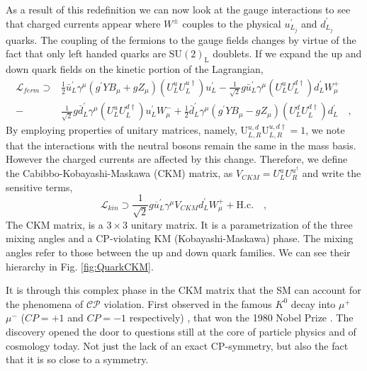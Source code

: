 As a result of this redefinition we can now look at the gauge interactions to see that charged currents appear where $W^\pm$ couples to the physical $u^\prime_{L_j}$ and $d^\prime_{L_j}$ quarks. 
%
The coupling of the fermions to the gauge fields changes by virtue of the fact that only left handed quarks are $\mathrm{SU(2)_L}$ doublets. If we expand the up and down quark fields on the kinetic portion of the Lagrangian,
%
\begin{equation}
\label{LagFermFCCCs}
\begin{aligned}
\mathcal{L}_{ferm} \supset & 
\frac{1}{2} \bar{u}^\prime_L \gamma^\mu \left( g^\prime Y B_\mu + g Z_\mu  \right) \left(U^u_L U^{u \dagger}_L \right) u^\prime_L - \frac{1}{\sqrt{2}} g \bar{u}^\prime_L \gamma^\mu \left( U^u_L U^{d \dagger}_L \right) d^\prime_L W^+_\mu \\    
- 
& \frac{1}{\sqrt{2}} g \bar{d}^\prime_L \gamma^\mu \left( U^u_L U^{d \dagger}_L \right) u^\prime_L W^-_\mu 
+ 
\frac{1}{2} \bar{d}^\prime_L \gamma^\mu \left( g^\prime Y B_\mu - g Z_\mu \right) \left( U^d_L U^{d \dagger}_L \right) d^\prime_L \quad , 
\end{aligned}
\end{equation}
%
By employing properties of unitary matrices, namely, $ \mathrm{U}^{u,d}_{L,R} \mathrm{U}^{u,d \dagger}_{L,R} = 1$, we note that the interactions with the neutral bosons remain the same in the mass basis.
%
However the charged currents are affected by this change.
%
Therefore, we define the Cabibbo-Kobayashi-Maskawa (CKM) matrix, as $V_{CKM} = U^u_L U^{u ^\dagger }_R $ and write the sensitive terms,
%
\begin{equation}
\mathcal{L}_{kin} \supset \frac{1}{\sqrt{2}} g \overline{u}^\prime_L \gamma^\mu V_{CKM} d_L^\prime W^+_\mu + \text{H.c.} \quad , 
\end{equation}
%
The CKM matrix, is a $3 \times 3$ unitary matrix. It is a parametrization of the three mixing angles and a CP-violating KM (Kobayashi-Maskawa) phase. %
%
The mixing angles refer to those between the up and down quark families. We can see their hierarchy in Fig. \ref{fig:QuarkCKM}.

It is through this complex phase in the CKM matrix that the SM can account for the phenomena of $\mathcal{CP}$ violation.
%
First observed in the famous $K^0$ decay into $\mu^+$ $\mu^-$ ($CP=+1$ and $CP=-1$ respectively) \cite{PhysRevLett.13.138}, that won the 1980 Nobel Prize \cite{NobelPrize:1980-Physics}. 
%
The discovery opened the door to questions still at the core of particle physics and of cosmology today.
%
Not just the lack of an exact CP-symmetry, but also the fact that it is so close to a symmetry.

